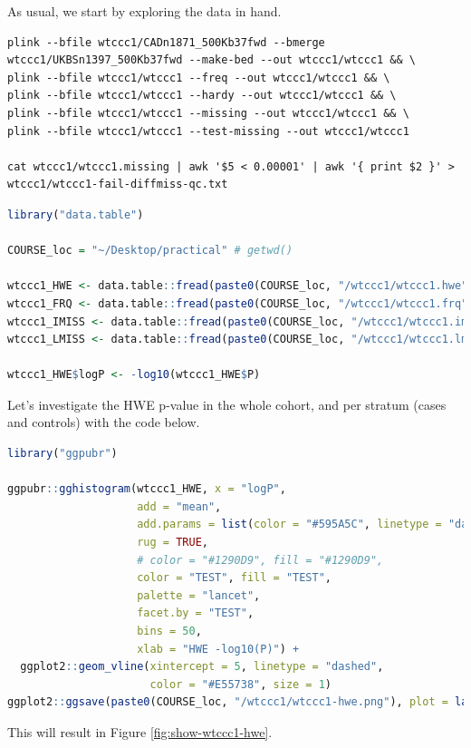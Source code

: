 \documentclass[
]{book}
\begin{document}
As usual, we start by exploring the data in hand.

\begin{lstlisting}
plink --bfile wtccc1/CADn1871_500Kb37fwd --bmerge wtccc1/UKBSn1397_500Kb37fwd --make-bed --out wtccc1/wtccc1 && \
plink --bfile wtccc1/wtccc1 --freq --out wtccc1/wtccc1 && \
plink --bfile wtccc1/wtccc1 --hardy --out wtccc1/wtccc1 && \
plink --bfile wtccc1/wtccc1 --missing --out wtccc1/wtccc1 && \
plink --bfile wtccc1/wtccc1 --test-missing --out wtccc1/wtccc1

cat wtccc1/wtccc1.missing | awk '$5 < 0.00001' | awk '{ print $2 }' > wtccc1/wtccc1-fail-diffmiss-qc.txt
\end{lstlisting}

\begin{lstlisting}[language=R]
library("data.table")

COURSE_loc = "~/Desktop/practical" # getwd()

wtccc1_HWE <- data.table::fread(paste0(COURSE_loc, "/wtccc1/wtccc1.hwe"))
wtccc1_FRQ <- data.table::fread(paste0(COURSE_loc, "/wtccc1/wtccc1.frq"))
wtccc1_IMISS <- data.table::fread(paste0(COURSE_loc, "/wtccc1/wtccc1.imiss"))
wtccc1_LMISS <- data.table::fread(paste0(COURSE_loc, "/wtccc1/wtccc1.lmiss"))

wtccc1_HWE$logP <- -log10(wtccc1_HWE$P)
\end{lstlisting}

Let's investigate the HWE p-value in the whole cohort, and per stratum (cases and controls) with the code below.

\begin{lstlisting}[language=R]
library("ggpubr")

ggpubr::gghistogram(wtccc1_HWE, x = "logP",
                    add = "mean",
                    add.params = list(color = "#595A5C", linetype = "dashed", size = 1),
                    rug = TRUE,
                    # color = "#1290D9", fill = "#1290D9",
                    color = "TEST", fill = "TEST",
                    palette = "lancet",
                    facet.by = "TEST",
                    bins = 50,
                    xlab = "HWE -log10(P)") +
  ggplot2::geom_vline(xintercept = 5, linetype = "dashed",
                      color = "#E55738", size = 1)
ggplot2::ggsave(paste0(COURSE_loc, "/wtccc1/wtccc1-hwe.png"), plot = last_plot())
\end{lstlisting}

This will result in Figure \ref{fig:show-wtccc1-hwe}.
\end{document}
